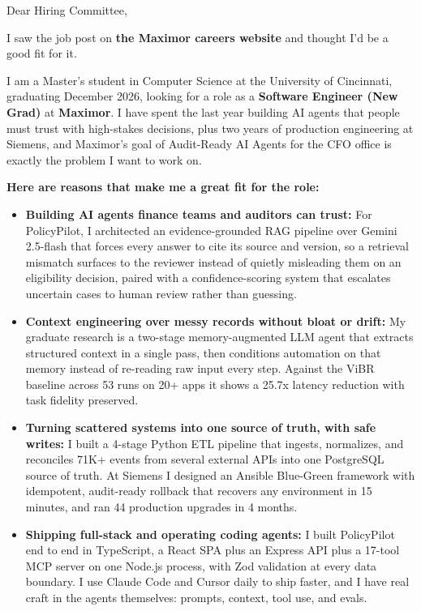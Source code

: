 \documentclass[11pt]{letter}
\date{}
\begin{document}
\begin{letter}{}

\opening{Dear Hiring Committee,}

I saw the job post on \textbf{the Maximor careers website} and thought I'd be a good fit for it.

I am a Master's student in Computer Science at the University of Cincinnati, graduating December 2026, looking for a role as a \textbf{Software Engineer (New Grad)} at \textbf{Maximor}. I have spent the last year building AI agents that people must trust with high-stakes decisions, plus two years of production engineering at Siemens, and Maximor's goal of Audit-Ready AI Agents for the CFO office is exactly the problem I want to work on.

\textbf{Here are reasons that make me a great fit for the role:}

\begin{itemize}[leftmargin=*, itemsep=0.45em]
    \item \textbf{Building AI agents finance teams and auditors can trust:} For PolicyPilot, I architected an evidence-grounded RAG pipeline over Gemini 2.5-flash that forces every answer to cite its source and version, so a retrieval mismatch surfaces to the reviewer instead of quietly misleading them on an eligibility decision, paired with a confidence-scoring system that escalates uncertain cases to human review rather than guessing.

    \item \textbf{Context engineering over messy records without bloat or drift:} My graduate research is a two-stage memory-augmented LLM agent that extracts structured context in a single pass, then conditions automation on that memory instead of re-reading raw input every step. Against the ViBR baseline across 53 runs on 20+ apps it shows a 25.7x latency reduction with task fidelity preserved.

    \item \textbf{Turning scattered systems into one source of truth, with safe writes:} I built a 4-stage Python ETL pipeline that ingests, normalizes, and reconciles 71K+ events from several external APIs into one PostgreSQL source of truth. At Siemens I designed an Ansible Blue-Green framework with idempotent, audit-ready rollback that recovers any environment in 15 minutes, and ran 44 production upgrades in 4 months.

    \item \textbf{Shipping full-stack and operating coding agents:} I built PolicyPilot end to end in TypeScript, a React SPA plus an Express API plus a 17-tool MCP server on one Node.js process, with Zod validation at every data boundary. I use Claude Code and Cursor daily to ship faster, and I have real craft in the agents themselves: prompts, context, tool use, and evals.
\end{itemize}


\end{letter}
\end{document}
